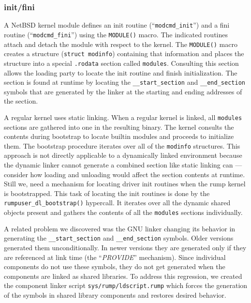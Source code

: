 \subsubsection*{init/fini}

A NetBSD kernel module defines an init routine
(``\verb+modcmd_init+'') and a fini routine (``\verb+modcmd_fini+'')
using the \verb+MODULE()+ macro.  The indicated routines attach
and detach the module with respect to the kernel.  The \verb+MODULE()+
macro creates a structure (\texttt{struct modinfo}) containing that
information and places the structure into a special \verb+.rodata+
section called \texttt{modules}.  Consulting this section allows
the loading party to locate the init routine and finish initialization.
The section is found at runtime by locating the \verb+__start_section+
and \verb+__end_section+ symbols that are generated by the linker
at the starting and ending addresses of the section.

A regular kernel uses static linking.  When a regular kernel is linked,
all \texttt{modules} sections are gathered into
one in the resulting binary.  The kernel consults the contents during bootstrap
to locate builtin modules and proceeds to initialize them.
The bootstrap procedure iterates over all of the \texttt{modinfo} structures.  This
approach is not directly applicable to a dynamically linked environment
because the dynamic linker cannot generate a combined section like static
linking can --- consider \eg how loading and unloading would affect the
section contents at runtime.  Still we, need a mechanism for locating
driver init routines when the rump kernel is bootstrapped.  This task of
locating the init routines is done by the \verb+rumpuser_dl_bootstrap()+
hypercall.  It iterates over all the dynamic shared objects present and
gathers the contents of all the \texttt{modules} sections individually.

A related problem we discovered was the GNU linker changing its
behavior in generating the \verb+__start_section+ and \verb+__end_section+
symbols.  Older versions generated them unconditionally.  In newer
versions they are generated only if they are referenced at link
time (the ``\textit{PROVIDE}'' mechanism).  Since individual
components do not use these symbols, they do not get generated when
the components are linked as shared libraries.  To address this
regression, we created the component linker script
\texttt{sys/rump/ldscript.rump} which forces the generation of the
symbols in shared library components and restores desired behavior.


